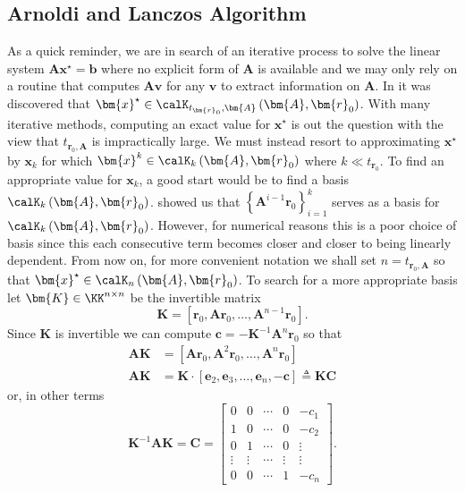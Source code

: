 \subsection{Arnoldi and Lanczos Algorithm}\label{Section4.3}

As a quick reminder, we are in search of an iterative process to solve the linear system $\bm{A} \bm{x}^{\star} = \bm{b}$ where no explicit form of $\bm{A}$ is available and we may only rely on a routine that computes $\bm{A} \bm{v}$ for any $\bm{v}$ to extract information on $\bm{A}$. In  it was discovered that $\bm{x}^{\star} \in \calK_{t_{\bm{r}_0}, \bm{A}} \left( \bm{A}, \bm{r}_0 \right)$. With many iterative methods, computing an exact value for $\bm{x}^{\star}$ is out the question with the view that $t_{\bm{r}_0, \bm{A}}$ is impractically large. We must instead resort to approximating $\bm{x}^{\star}$ by $\bm{x}_k$ for which $\bm{x}^{k} \in \calK_{k} \left( \bm{A}, \bm{r}_0 \right)$ where $k \ll t_{\bm{r}_0}$. To find an appropriate value for $\bm{x}_k$, a good start would be to find a basis $\calK_{k} \left( \bm{A}, \bm{r}_0 \right)$.  showed us that $\left\{ \bm{A}^{i-1} \bm{r}_0 \right\}_{i=1}^{k}$ serves as a basis for $\calK_{k} \left( \bm{A}, \bm{r}_0 \right)$. However, for numerical reasons this is a poor choice of basis since this each consecutive term becomes closer and closer to being linearly dependent. From now on, for more convenient notation we shall set $n = t_{\bm{r}_0, \bm{A}}$ so that $\bm{x}^{\star} \in \calK_{n} \left( \bm{A}, \bm{r}_0 \right)$. To search for a more appropriate basis let $\bm{K} \in \KK^{n \times n}$ be the invertible matrix
\[
    \bm{K} = \left[ \bm{r}_0 , \bm{A} \bm{r}_0, \ldots , \bm{A}^{n-1} \bm{r}_0 \right].
\]
Since $\bm{K}$ is invertible we can compute $\bm{c} = - \bm{K}^{-1} \bm{A}^{n} \bm{r}_0$ so that
\begin{align*}
    \bm{A} \bm{K} & = \left[ \bm{A} \bm{r}_0, \bm{A}^{2} \bm{r}_0, \ldots , \bm{A}^{n} \bm{r}_0 \right]                     \\
    \bm{A} \bm{K} & = \bm{K} \cdot \left[ \bm{e}_2, \bm{e}_3, \ldots , \bm{e}_n, - \bm{c}  \right] \triangleq \bm{K} \bm{C}
\end{align*}
or, in other terms
\[
    \bm{K}^{-1} \bm{A} \bm{K} = \bm{C} =
    \begin{bmatrix}
        0      & 0      & \cdots & 0      & -c_1   \\
        1      & 0      & \cdots & 0      & -c_2   \\
        0      & 1      & \cdots & 0      & \vdots \\
        \vdots & \vdots & \cdots & \vdots & \vdots \\
        0      & 0      & \cdots & 1      & -c_n
    \end{bmatrix}.
\]
